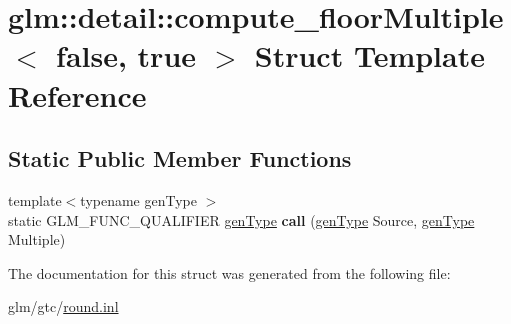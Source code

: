\hypertarget{structglm_1_1detail_1_1compute__floorMultiple_3_01false_00_01true_01_4}{\section{glm\-:\-:detail\-:\-:compute\-\_\-floor\-Multiple$<$ false, true $>$ Struct Template Reference}
\label{structglm_1_1detail_1_1compute__floorMultiple_3_01false_00_01true_01_4}
}
\subsection*{Static Public Member Functions}
\begin{DoxyCompactItemize}
\item 
\hypertarget{structglm_1_1detail_1_1compute__floorMultiple_3_01false_00_01true_01_4_a1d2dfa9746c67e805de83b41b6a7a94d}{{\footnotesize template$<$typename gen\-Type $>$ }\\static G\-L\-M\-\_\-\-F\-U\-N\-C\-\_\-\-Q\-U\-A\-L\-I\-F\-I\-E\-R \hyperlink{structglm_1_1detail_1_1genType}{gen\-Type} {\bfseries call} (\hyperlink{structglm_1_1detail_1_1genType}{gen\-Type} Source, \hyperlink{structglm_1_1detail_1_1genType}{gen\-Type} Multiple)}\label{structglm_1_1detail_1_1compute__floorMultiple_3_01false_00_01true_01_4_a1d2dfa9746c67e805de83b41b6a7a94d}

\end{DoxyCompactItemize}


The documentation for this struct was generated from the following file\-:\begin{DoxyCompactItemize}
\item 
glm/gtc/\hyperlink{round_8inl}{round.\-inl}\end{DoxyCompactItemize}
